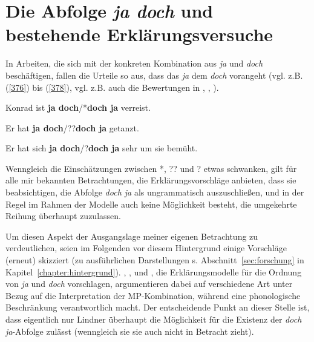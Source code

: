 \section{Die Abfolge \textit{ja doch} und bestehende Erklärungsversuche}
\label{sec:abfolgejd}
In Arbeiten, die sich mit der konkreten Kombination aus \textit{ja} und \textit{doch} beschäftigen, fallen die Urteile so aus, dass das \textit{ja} dem \textit{doch} vorangeht (vgl. z.B. (\ref{376}) bis (\ref{378}), vgl. z.B. auch die Bewertungen in \citealt[101]{Meibauer1994}, \citealt[93]{Ormelius-Sandblom1997}, \citealt[431]{Rinas2007}).
\begin{exe}
	\ex\label{376} 
	Konrad ist \textbf{ja doch}/*\textbf{doch ja} verreist.
\hfill\hbox {\citet[114]{Doherty1987}}
\end{exe}
\vspace{-0.5cm}
\begin{exe}
	\ex\label{377} 
	Er hat \textbf{ja doch}/??\textbf{doch ja} getanzt.
\hfill\hbox {\citet[20]{Struckmeier2014}}
\end{exe}
\vspace{-0.5cm}
\begin{exe}
	\ex\label{378} 
	Er hat sich \textbf{ja doch}/?\textbf{doch ja} sehr um sie bemüht.
\hfill\hbox {\citet[157]{Jacobs1991}}
\end{exe}
Wenngleich die Einschätzungen zwischen *, ?? und ? etwas schwanken, gilt für alle mir bekannten Betrachtungen, die Erklärungsvorschläge anbieten, dass sie beabsichtigen, die Abfolge \textit{doch ja} als ungrammatisch auszuschließen, und in der Regel im Rahmen der Modelle auch keine Möglichkeit besteht, die umgekehrte Reihung überhaupt zuzulassen.

Um diesen Aspekt der Ausgangslage meiner eigenen Betrachtung zu verdeutlichen, seien im Folgenden vor diesem Hintergrund einige Vorschläge (erneut) skizziert (zu ausführlichen Darstellungen s. Abschnitt~\ref{sec:forschung} in Kapitel~\ref{chapter:hintergrund}). \citet{Doherty1985, Doherty1987}, \citet{Ickler1994}, \citet{Ormelius-Sandblom1997} und \citet{Rinas2007}, die Erklärungsmodelle für die Ordnung von \textit{ja} und \textit{doch} vorschlagen, argumentieren dabei auf verschiedene Art unter Bezug auf die Interpretation der MP-Kombination, während \citet{Lindner1991} eine phonologische Beschränkung verantwortlich macht. Der entscheidende Punkt an dieser Stelle ist, dass eigentlich nur Lindner überhaupt die Möglichkeit für die Existenz der \textit{doch ja}-Abfolge zulässt (wenngleich sie sie auch nicht in Betracht zieht).

